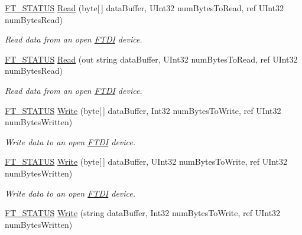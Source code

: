 \begin{DoxyCompactItemize}
\mbox{\hyperlink{class_f_t_d2_x_x___n_e_t_1_1_f_t_d_i_aabe20ad905cc4ccc1e35dd5b877d9a83}{F\+T\+\_\+\+S\+T\+A\+T\+US}} \mbox{\hyperlink{class_f_t_d2_x_x___n_e_t_1_1_f_t_d_i_a22ce63b7b2e1de26473037f07b4d8045}{Read}} (byte\mbox{[}$\,$\mbox{]} data\+Buffer, U\+Int32 num\+Bytes\+To\+Read, ref U\+Int32 num\+Bytes\+Read)
\begin{DoxyCompactList}\small\item\em Read data from an open \mbox{\hyperlink{class_f_t_d2_x_x___n_e_t_1_1_f_t_d_i}{F\+T\+DI}} device. \end{DoxyCompactList}\item 
\mbox{\hyperlink{class_f_t_d2_x_x___n_e_t_1_1_f_t_d_i_aabe20ad905cc4ccc1e35dd5b877d9a83}{F\+T\+\_\+\+S\+T\+A\+T\+US}} \mbox{\hyperlink{class_f_t_d2_x_x___n_e_t_1_1_f_t_d_i_a402a6ee1e76ee69421b43f9953809256}{Read}} (out string data\+Buffer, U\+Int32 num\+Bytes\+To\+Read, ref U\+Int32 num\+Bytes\+Read)
\begin{DoxyCompactList}\small\item\em Read data from an open \mbox{\hyperlink{class_f_t_d2_x_x___n_e_t_1_1_f_t_d_i}{F\+T\+DI}} device. \end{DoxyCompactList}\item 
\mbox{\hyperlink{class_f_t_d2_x_x___n_e_t_1_1_f_t_d_i_aabe20ad905cc4ccc1e35dd5b877d9a83}{F\+T\+\_\+\+S\+T\+A\+T\+US}} \mbox{\hyperlink{class_f_t_d2_x_x___n_e_t_1_1_f_t_d_i_ae4bf804419aada362d58ac3341a59726}{Write}} (byte\mbox{[}$\,$\mbox{]} data\+Buffer, Int32 num\+Bytes\+To\+Write, ref U\+Int32 num\+Bytes\+Written)
\begin{DoxyCompactList}\small\item\em Write data to an open \mbox{\hyperlink{class_f_t_d2_x_x___n_e_t_1_1_f_t_d_i}{F\+T\+DI}} device. \end{DoxyCompactList}\item 
\mbox{\hyperlink{class_f_t_d2_x_x___n_e_t_1_1_f_t_d_i_aabe20ad905cc4ccc1e35dd5b877d9a83}{F\+T\+\_\+\+S\+T\+A\+T\+US}} \mbox{\hyperlink{class_f_t_d2_x_x___n_e_t_1_1_f_t_d_i_aa61b3a2747292840d8cc0028e4dea0c4}{Write}} (byte\mbox{[}$\,$\mbox{]} data\+Buffer, U\+Int32 num\+Bytes\+To\+Write, ref U\+Int32 num\+Bytes\+Written)
\begin{DoxyCompactList}\small\item\em Write data to an open \mbox{\hyperlink{class_f_t_d2_x_x___n_e_t_1_1_f_t_d_i}{F\+T\+DI}} device. \end{DoxyCompactList}\item 
\mbox{\hyperlink{class_f_t_d2_x_x___n_e_t_1_1_f_t_d_i_aabe20ad905cc4ccc1e35dd5b877d9a83}{F\+T\+\_\+\+S\+T\+A\+T\+US}} \mbox{\hyperlink{class_f_t_d2_x_x___n_e_t_1_1_f_t_d_i_a312316e03a46bf6b8a5bea994a20e964}{Write}} (string data\+Buffer, Int32 num\+Bytes\+To\+Write, ref U\+Int32 num\+Bytes\+Written)

\end{DoxyCompactItemize}
